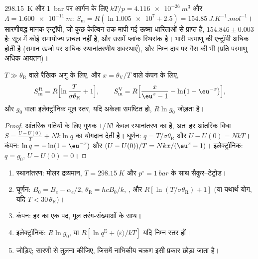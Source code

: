 \qty{298.15}{K} और \qty{1}{bar} पर आर्गन के लिए $kT/p = \qty{4.116e-26}{m^3}$ और $\Lambda =
\qty{1.600e-11}{m}$: $S_{\mathrm m} = R(\ln\num{1.005e7} + 2.5) = \qty{154.85}{J.K^{-1}.mol^{-1}}$।
सारणीबद्ध मानक एन्ट्रॉपी, जो कुछ केल्विन तक मापी गई ऊष्मा धारिताओं से प्राप्त है,
$154.846 \pm 0.003$ है: सूत्र में कोई समायोज्य प्राचल नहीं है, और
उसमें प्लांक स्थिरांक है। भारी परमाणु की एन्ट्रॉपी अधिक होती है (समान ऊर्जा पर अधिक
स्थानांतरणीय अवस्थाएँ), और निम्न दाब पर गैस की भी
(प्रति परमाणु अधिक आयतन)।

\begin{proposition}[घूर्णी और कंपनिक मोलर एन्ट्रॉपियाँ]\label{prop:b3:partition-functions:modes-entropy}
$T \gg \theta_{\mathrm R}$ वाले रैखिक अणु के लिए, और $x = \theta_{\mathrm V}/T$ वाले कंपन के लिए,
\[
  S^{\mathrm R}_{\mathrm m} = R\Bigl[\ln\frac{T}{\sigma\theta_{\mathrm R}} + 1\Bigr],
  \qquad
  S^{\mathrm V}_{\mathrm m} = R\Bigl[\frac{x}{\eu^x - 1} - \ln\bigl(1 - \eu^{-x}\bigr)\Bigr],
\]
और  $g_0$ वाला इलेक्ट्रॉनिक मूल स्तर, यदि अकेला समष्टित हो, $R\ln g_0$ जोड़ता है।
\end{proposition}

\begin{proof}
आंतरिक गतियों के लिए गुणक $1/N!$ केवल स्थानांतरण का है, अतः हर
आंतरिक विधा $S = \frac{U - U(0)}{T} + Nk\ln q$ का योगदान देती है। घूर्णन:
$q = T/\sigma\theta_{\mathrm R}$ और $U - U(0) = NkT$। कंपन: $\ln q = -\ln(1 - \eu^{-x})$ और
$(U - U(0))/T = Nkx/(\eu^x - 1)$। इलेक्ट्रॉनिक: $q = g_0$, $U - U(0) = 0$।
\end{proof}

\begin{method}[स्थिरांकों से किसी गैस की मानक एन्ट्रॉपी]\label{met:b3:partition-functions:standard-entropy}
\begin{enumerate}
  \item स्थानांतरण: मोलर द्रव्यमान, $T = \qty{298.15}{K}$ और
        $p^\circ = \qty{1}{bar}$ के साथ सैकुर--टेट्रोड।
  \item घूर्णन: $B_0 = B_e - \alpha_e/2$, $\theta_{\mathrm R} = hcB_0/k$, ,
        और $R[\ln(T/\sigma\theta_{\mathrm R}) + 1]$ (या यथार्थ योग, यदि $T < 30\,\theta_{\mathrm R}$)।
  \item कंपन: हर  का एक पद, मूल तरंग-संख्याओं के साथ।
  \item इलेक्ट्रॉनिक: $R\ln g_0$, या $R[\ln q^{\mathrm E} + \langle\varepsilon\rangle/kT]$ यदि निम्न स्तर हों।
  \item जोड़िए; सारणी से तुलना कीजिए, जिसमें नाभिकीय चक्रण इसी प्रकार छोड़ा जाता है।
\end{enumerate}
\end{method}

